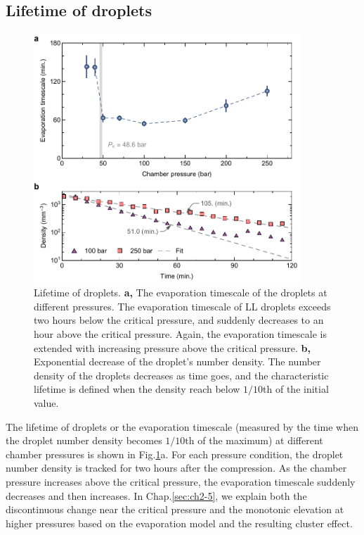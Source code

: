 \subsection{Lifetime of droplets}
\label{sec:ch2-3-3}

\begin{figure}[ht!]
\centering
\includegraphics[width=100mm]{figures/ch2/droplet/evaporation.pdf}
\caption{Lifetime of droplets. \textbf{a,} The evaporation timescale of the droplets at different pressures. The evaporation timescale of LL droplets exceeds two hours below the critical pressure, and suddenly decreases to an hour above the critical pressure. Again, the evaporation timescale is extended with increasing pressure above the critical pressure. \textbf{b,} Exponential decrease of the droplet's number density. The number density of the droplets decreases as time goes, and the characteristic lifetime is defined when the density reach below $1/10$th of the initial value.}
\label{fig:lifetime}
\end{figure}

The lifetime of droplets or the evaporation timescale (measured by the time when the droplet number density becomes $1/10 \text{th}$ of the maximum) at different chamber pressures is shown in Fig.\ref{fig:lifetime}a. For each pressure condition, the droplet number density is tracked for two hours after the compression. As the chamber pressure increases above the critical pressure, the evaporation timescale suddenly decreases and then increases. In Chap.\ref{sec:ch2-5}, we explain both the discontinuous change near the critical pressure and the monotonic elevation at higher pressures based on the evaporation model and the resulting cluster effect.

